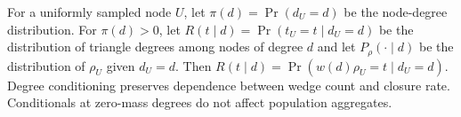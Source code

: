 For a uniformly sampled node $U$, let $\pi(d)=\Pr(d_U=d)$ be the node-degree distribution.
For $\pi(d)>0$, let $R(t\mid d)=\Pr(t_U=t\mid d_U=d)$ be the distribution of triangle degrees among nodes of degree $d$ and let $P_\rho(\cdot\mid d)$ be the distribution of $\rho_U$ given $d_U=d$. 
Then $R(t\mid d)=\Pr(w(d)\rho_U=t\mid d_U=d)$. 
Degree conditioning preserves dependence between wedge count and closure rate. Conditionals at zero-mass degrees do not affect population aggregates.





